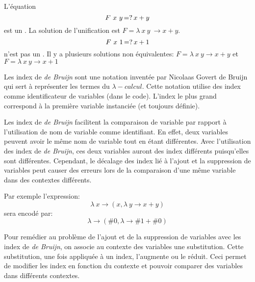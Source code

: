                 L'équation
                \begin{equation}
                    F\ x\ y \operatorname{\mathbin{=?}} x + y
                \end{equation}
                est un \hop{}. La solution de l'unification est $F = \lambda\ x\ y\ \rightarrow x + y$.
                \begin{equation}
                    F\ x\ 1 \operatorname{\mathbin{=?}} x + 1
                \end{equation}
                n'est pas un \hop{}. Il y a plusieurs solutions non équivalentes: $F = \lambda\ x\ y \rightarrow x + y$ et $F = \lambda\ x\ y \rightarrow x + 1$

                Les index de \textit{de Bruijn} sont une notation inventée par Nicolaas Govert de Bruijn qui sert à représenter les
                termes du $\lambda{}-calcul$. Cette notation utilise des index comme identificateur de variables (dans le code). L'index le plus grand
                correspond à la première variable instanciée (et toujours définie).

                Les index de \textit{de Bruijn} facilitent la comparaison de variable par rapport à l'utilisation de nom de variable comme identifiant.
                En effet, deux variables peuvent avoir le même nom de variable tout en étant différentes. Avec l'utilisation des index de \textit{de Bruijn},
                ces deux variables auront des index différents puisqu'elles sont différentes.
                Cependant, le décalage des index lié à l'ajout et la suppression de variables peut causer des erreurs lors de la comparaison d'une même
                variable dans des contextes différents.

                Par exemple l'expression:
                \begin{equation}
                    \lambda\ x \rightarrow (x, \lambda\ y \rightarrow x + y)
                \end{equation}
                sera encodé par:
                \begin{equation}
                    \lambda \rightarrow (\#0, \lambda \rightarrow \#1 + \#0)
                \end{equation}

                Pour remédier au problème de l'ajout et de la suppression de variables avec les index de \textit{de Bruijn}, on associe au contexte des
                variables une substitution. Cette substitution, une fois appliquée à un index, l'augmente ou le réduit.
                Ceci permet de modifier les index en fonction du contexte et pouvoir comparer des variables dans différents contextes.

